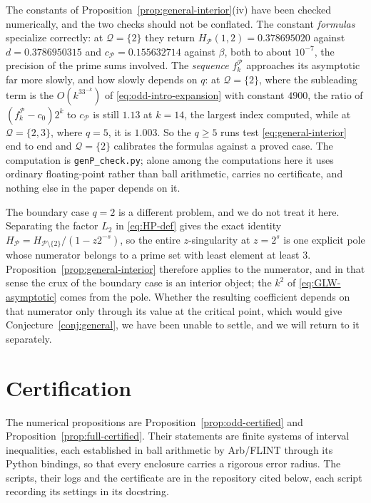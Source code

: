 \documentclass[11pt]{amsart}
\theoremstyle{plain}
\theoremstyle{definition}
\begin{document}
The constants of Proposition~\ref{prop:general-interior}(iv) have been checked
numerically, and the two checks should not be conflated. The constant
\emph{formulas} specialize correctly: at $\mathcal Q=\{2\}$ they return
$H_{\mathcal P}(1,2)=0.378695020$ against $d=0.3786950315$ and
$c_{\mathcal P}=0.155632714$ against $\beta$, both to about $10^{-7}$, the
precision of the prime sums involved. The \emph{sequence} $f_k^{\mathcal P}$
approaches its asymptotic far more slowly, and how slowly depends on $q$: at
$\mathcal Q=\{2\}$, where the subleading term is the $O(k^33^{-k})$ of
\eqref{eq:odd-intro-expansion} with constant $4900$, the ratio of
$(f_k^{\mathcal P}-c_0)2^{k}$ to $c_{\mathcal P}$ is still $1.13$ at $k=14$,
the largest index computed, while at $\mathcal Q=\{2,3\}$, where $q=5$, it is
$1.003$. So the $q\geq5$ runs test \eqref{eq:general-interior} end to end and
$\mathcal Q=\{2\}$ calibrates the formulas against a proved case. The
computation is \texttt{genP\_check.py}; alone among the computations here it
uses ordinary floating-point rather than ball arithmetic, carries no
certificate, and nothing else in the paper depends on it.

The boundary case $q=2$ is a different problem, and we do not treat it here.
Separating the factor $L_2$ in \eqref{eq:HP-def} gives the exact identity
$H_{\mathcal P}=H_{\mathcal P\setminus\{2\}}/(1-z2^{-s})$, so the entire
$z$-singularity at $z=2^{s}$ is one explicit pole whose numerator belongs to a
prime set with least element at least $3$. Proposition~\ref{prop:general-interior}
therefore applies to the numerator, and in that sense the crux of the boundary
case is an interior object; the $k^2$ of \eqref{eq:GLW-asymptotic} comes from
the pole. Whether the resulting coefficient depends on that numerator only
through its value at the critical point, which would give
Conjecture~\ref{conj:general}, we have been unable to settle, and we will
return to it separately.

\section{Certification}\label{sec:certification}

The numerical propositions are Proposition~\ref{prop:odd-certified} and
Proposition~\ref{prop:full-certified}. Their statements are finite systems of
interval inequalities, each established in ball arithmetic by Arb/FLINT
\cite{Arb} through its Python bindings, so that every enclosure carries a
rigorous error radius. The scripts, their logs and the certificate are in the
repository cited below, each script recording its settings in its docstring.
\end{document}
